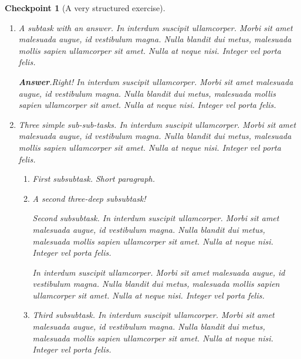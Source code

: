 \documentclass{sn-jnl}
\theoremstyle{thmstyleone}%
\theoremstyle{thmstyletwo}%
\newtheorem{inlineexercise}[theorem]{Checkpoint}
\theoremstyle{thmstylethree}%
\newcommand{\blocktitlefont}{\relax}
\newcommand{\lititle}[1]{{\slshape#1}}
\numberwithin{equation}{section}
\begin{document}
\begin{inlineexercise}[A very structured exercise]
\begin{enumerate}[font=\bfseries,label=(\alph*),ref=\alph*]
\begin{enumerate}[font=\bfseries,label=(\roman*),ref=\theenumi.\roman*]
A really simple subtask.  In interdum suscipit ullamcorper. Morbi sit amet malesuada augue, id vestibulum magna. Nulla blandit dui metus, malesuada mollis sapien ullamcorper sit amet. Nulla at neque nisi. Integer vel porta felis.%
\par
A short paragraph, before an answer.%
\par\smallskip%
\noindent\textbf{\blocktitlefont Answer}.\hypertarget{exercise-structured-5-3-3}{}\quad{}With a proof.%
\begin{proof}\label{exercise-structured-5-3-3-2}%
In interdum suscipit ullamcorper. Morbi sit amet malesuada augue, id vestibulum magna. Nulla blandit dui metus, malesuada mollis sapien ullamcorper sit amet. Nulla at neque nisi. Integer vel porta felis.%
\end{proof}
And a bit more to say.%
\item{}A subtask with an answer.  In interdum suscipit ullamcorper. Morbi sit amet malesuada augue, id vestibulum magna. Nulla blandit dui metus, malesuada mollis sapien ullamcorper sit amet. Nulla at neque nisi. Integer vel porta felis.%
\par\smallskip%
\noindent\textbf{\blocktitlefont Answer}.\hypertarget{exercise-structured-5-4-2}{}\quad{}Right!  In interdum suscipit ullamcorper. Morbi sit amet malesuada augue, id vestibulum magna. Nulla blandit dui metus, malesuada mollis sapien ullamcorper sit amet. Nulla at neque nisi. Integer vel porta felis.%
\item{}Three simple sub-sub-tasks.  In interdum suscipit ullamcorper. Morbi sit amet malesuada augue, id vestibulum magna. Nulla blandit dui metus, malesuada mollis sapien ullamcorper sit amet. Nulla at neque nisi. Integer vel porta felis.%
\begin{enumerate}[font=\bfseries,label=(\Alph*),ref=\theenumi.\theenumii.\Alph*]%
\item{}First subsubtask.  Short paragraph.%
\item{}\lititle{A second three-deep subsubtask!}\par%
Second subsubtask.  In interdum suscipit ullamcorper. Morbi sit amet malesuada augue, id vestibulum magna. Nulla blandit dui metus, malesuada mollis sapien ullamcorper sit amet. Nulla at neque nisi. Integer vel porta felis.%
\par
In interdum suscipit ullamcorper. Morbi sit amet malesuada augue, id vestibulum magna. Nulla blandit dui metus, malesuada mollis sapien ullamcorper sit amet. Nulla at neque nisi. Integer vel porta felis.%
\item{}Third subsubtask.  In interdum suscipit ullamcorper. Morbi sit amet malesuada augue, id vestibulum magna. Nulla blandit dui metus, malesuada mollis sapien ullamcorper sit amet. Nulla at neque nisi. Integer vel porta felis.%

\end{enumerate}
\end{enumerate}
\end{enumerate}
\end{inlineexercise}
\end{document}
